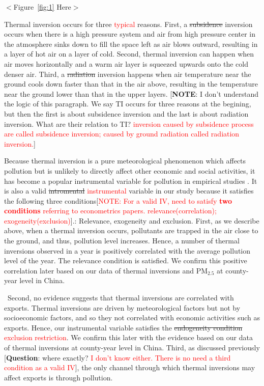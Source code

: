 \documentclass[12pt]{article}
\begin{document}
\begin{center}
  $<$Figure~\ref{fig:1} Here$>$
  \end{center}
  
  Thermal inversion occurs for three \textcolor{red}{typical} reasons. First, a \sout{subsidence} inversion
  occurs when there is a high pressure system and air from high pressure
  center in the atmosphere sinks down to fill the space left as air blows
  outward, resulting in a layer of hot air on a layer of cold. Second, thermal
  inversion can happen when air moves horizontally and a warm air layer is
  squeezed upwards onto the cold denser air. Third, a \sout{radiation} inversion
  happens when air temperature near the ground cools down faster than that in
  the air above, resulting in the temperature near the ground lower than that
  in the upper layers. [\textbf{NOTE}: I don't understand the logic of this
  paragraph. We say TI occurs for three reasons at the begining, but then the
  first is about subsidence inversion and the last is about radiation
  inversion. What are their relation to TI? \textcolor{red}{inversion caused by subsidence process are called subsidence inversion; caused by ground radiation called radiation inversion.}]
  
  Because thermal inversion is a pure meteorological phenomenon which affects
  pollution but is unlikely to directly affect other economic and social
  activities, it has become a popular instrumental variable for pollution in
  empirical studies %
  \citep{arceo2016does,jans2018economic,sager2019estimating,chen2022effect,NBERw28401}%
  . It is also a valid \sout{intromental} \textcolor{red}{instrumental} variable in our study because it satisfies
  the following three conditions[\textcolor{red}{NOTE: For a valid IV, need to satisfy \textbf{two conditions} referring to econometrics papers. relevance(correlation); exogeneity(exclusion)}].: Relevance, exogeneity and exclusion. First,
  as we describe above, when a thermal inversion occurs, pollutants are
  trapped in the air close to the ground, and thus, pollution level increases.
  Hence, a number of thermal inversions observed in a year is positively
  correlated with the average pollution level of the year. The relevance
  condition is satisfied. We confirm this positive correlation later based on
  our data of thermal inversions and $\mathrm{PM_{2.5}}$ at county-year level
  in China.
  
  \  Second, no evidence suggests that thermal inversions are correlated with
  exports. Thermal inversions are driven by meteorological factors but not by
  socioeconomic factors, and so they not correlated with economic activities
  such as exports. Hence, our instrumental variable satisfies the \sout{endogeneity
  condition} \textcolor{red}{exclusion restriction}. We confirm this later with the evidence based on our data of
  thermal inversions at county-year level in China. Third, as discussed
  previously [\textbf{Question}: where exactly? \textcolor{red}{I don't know either. There is no need a third condition as a valid IV}], the only channel through
  which thermal inversions may affect exports is through pollution. 
\end{document}
